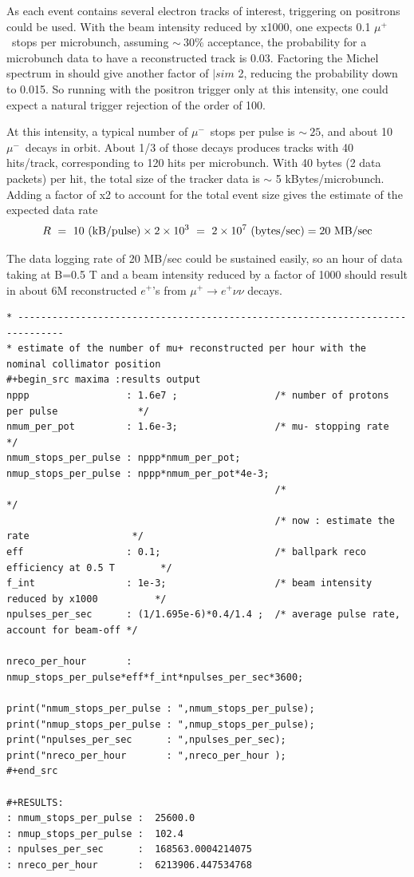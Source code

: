 \documentclass[12pt]{article}
\newcommand {\muminus}    {\mbox{$\mu^-$}}
\newcommand {\muplus}    {\mbox{$\mu^+$}}
\newcommand {\ra}        {\rightarrow}
\begin{document}
As each event contains several electron tracks of interest, triggering on positrons could be used.
With the beam intensity reduced by x1000, one expects 0.1 \muplus\ stops per microbunch, assuming
$\sim ~30\%$ acceptance, the probability for a microbunch data to have a reconstructed track is 0.03.
Factoring the Michel spectrum in should give another factor of $|sim$ 2, reducing the probability
down to 0.015. So running with the positron trigger only at this intensity, one could expect
a natural trigger rejection of the order of 100.

At this intensity, a typical number of \muminus\ stops per pulse is $\sim ~25$, and about
10 \muminus\ decays in orbit. 
%
About 1/3 of those decays produces tracks with 40 hits/track, corresponding to 120 hits per microbunch.
With 40 bytes (2 data packets) per hit, the total size of the tracker data is $\sim$ 5 kBytes/microbunch.  
Adding a factor of x2 to account for the total event size gives the estimate of the expected data rate 
$$
R ~=~ 10 ~({\rm kB/pulse}) \times 2 \times 10^3 ~=~ 2 \times 10^7 ~({\rm bytes/sec}) = 20 ~{\rm MB/sec}
$$

The data logging rate of 20 MB/sec could be sustained easily, so an hour of data taking at B=0.5 T
and a beam intensity reduced by a factor of 1000 should result in about 6M reconstructed $e^+$'s
from $\mu^+ \ra e^+ \nu \nu$ decays.
%

\scriptsize{
\begin{verbatim}
* ------------------------------------------------------------------------------
* estimate of the number of mu+ reconstructed per hour with the nominal collimator position      
#+begin_src maxima :results output
nppp                 : 1.6e7 ;                 /* number of protons per pulse              */
nmum_per_pot         : 1.6e-3;                 /* mu- stopping rate                        */
nmum_stops_per_pulse : nppp*nmum_per_pot;
nmup_stops_per_pulse : nppp*nmum_per_pot*4e-3;
                                               /*                                          */
                                               /* now : estimate the rate                  */
eff                  : 0.1;                    /* ballpark reco efficiency at 0.5 T        */
f_int                : 1e-3;                   /* beam intensity reduced by x1000          */
npulses_per_sec      : (1/1.695e-6)*0.4/1.4 ;  /* average pulse rate, account for beam-off */

nreco_per_hour       : nmup_stops_per_pulse*eff*f_int*npulses_per_sec*3600;

print("nmum_stops_per_pulse : ",nmum_stops_per_pulse);
print("nmup_stops_per_pulse : ",nmup_stops_per_pulse);
print("npulses_per_sec      : ",npulses_per_sec);
print("nreco_per_hour       : ",nreco_per_hour );
#+end_src

#+RESULTS:
: nmum_stops_per_pulse :  25600.0 
: nmup_stops_per_pulse :  102.4 
: npulses_per_sec      :  168563.0004214075 
: nreco_per_hour       :  6213906.447534768 
\end{verbatim}
}
\end{document}
